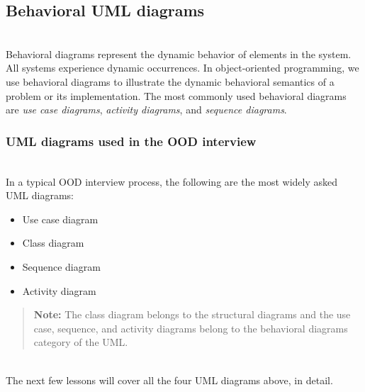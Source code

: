 \subsection{Behavioral UML diagrams}\label{behavioral-uml-diagrams}
\\
Behavioral diagrams represent the dynamic behavior of elements in the system. All systems experience dynamic occurrences. In object-oriented programming, we use behavioral diagrams to illustrate the dynamic behavioral semantics of a problem or its implementation. The most commonly used behavioral diagrams are \emph{use case diagrams}, \emph{activity diagrams}, and \emph{sequence diagrams}.

\subsubsection{UML diagrams used in the OOD interview}\label{uml-diagrams-used-in-the-ood-interview}
\\
In a typical OOD interview process, the following are the most widely asked UML diagrams:

\begin{itemize}
\item
Use case diagram
\item
Class diagram
\item
Sequence diagram
\item
Activity diagram
\end{itemize}
\begin{quote}
\textbf{Note:} The class diagram belongs to the structural diagrams and the use case, sequence, and activity diagrams belong to the behavioral diagrams category of the UML.
\end{quote}
\\
The next few lessons will cover all the four UML diagrams above, in detail.

